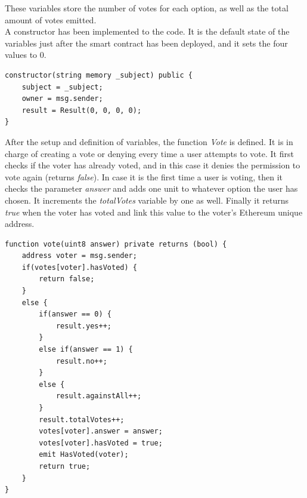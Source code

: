 \documentclass[10pt]{article}
\begin{document}
\begin{multicols}{2}
These variables store the number of votes for each option, as well as the total amount of votes emitted.\\

A constructor has been implemented to the code. It is the default state of the variables just after the smart contract has been deployed, and it sets the four values to 0.\\

\begin{lstlisting}[language=Solidity]
constructor(string memory _subject) public {
	subject = _subject;
	owner = msg.sender;
	result = Result(0, 0, 0, 0);
}
\end{lstlisting}

After the setup and definition of variables, the function \textit{Vote} is defined. It is in charge of creating a vote or denying every time a user attempts to vote. It first checks if the voter has already voted, and in this case it denies the permission to vote again (returns \textit{false}). In case it is the first time a user is voting, then it checks the parameter \textit{answer} and adds one unit to whatever option the user has chosen. It increments the \textit{totalVotes} variable by one as well. Finally it returns \textit{true} when the voter has voted and link this value to the voter's Ethereum unique address.\\

\begin{lstlisting}[language=Solidity]
function vote(uint8 answer) private returns (bool) {
	address voter = msg.sender;
	if(votes[voter].hasVoted) {
		return false;
	}
	else {
		if(answer == 0) {
			result.yes++;
		}
		else if(answer == 1) {
			result.no++;
		}
		else {
			result.againstAll++;
		}
		result.totalVotes++;
		votes[voter].answer = answer;
		votes[voter].hasVoted = true;
		emit HasVoted(voter);
		return true;
	}
}
\end{lstlisting}



\end{multicols}
\end{document}
